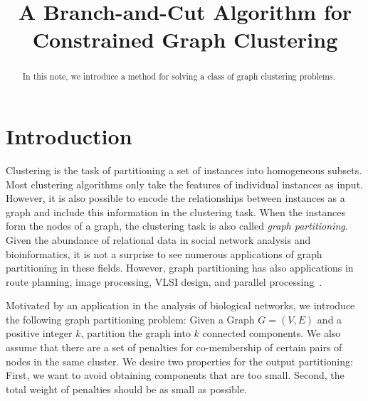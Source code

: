 \documentclass[conference,compsoc]{IEEEtran}
\begin{document}
\title{A Branch-and-Cut Algorithm for Constrained Graph Clustering}

\author{
\and
{}
\and
{}
}

\maketitle

\begin{abstract}
In this note, we introduce a method for solving a class of graph
clustering problems.
\end{abstract}

\section{Introduction}
\label{introduction}

Clustering is the task of partitioning a set of instances into
homogeneous subsets. Most clustering algorithms only take the features
of individual instances as input. However, it is also possible to
encode the relationships between instances as a graph and include this
information in the clustering task. When the instances form the nodes
of a graph, the clustering task is also called \emph{graph
  partitioning}. Given the abundance of relational data in social
network analysis and bioinformatics, it is not a surprise to see
numerous applications of graph partitioning in these fields. However,
graph partitioning has also applications in route planning, image
processing, VLSI design, and parallel processing~\cite{Survey}.

Motivated by an application in the analysis of biological networks, we
introduce the following graph partitioning problem: Given a Graph
$G=(V, E)$ and a positive integer $k$, partition the graph into $k$
connected components. We also assume that there are a set of penalties
for co-membership of certain pairs of nodes in the same cluster. We
desire two properties for the output partitioning: First, we want to
avoid obtaining components that are too small. Second, the total
weight of penalties should be as small as possible.
\end{document}
